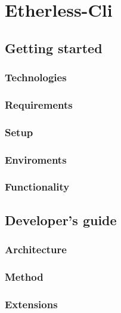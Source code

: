 \section{Etherless-Cli}

	\subsection{Getting started}
	
		\subsubsection{Technologies} %
			
		\subsubsection{Requirements} %
			
		\subsubsection{Setup} %
		
		\subsubsection{Enviroments} %
		
		\subsubsection{Functionality} %
	
	
	\subsection{Developer's guide}
	
		\subsubsection{Architecture} %
		
		\subsubsection{Method} %
		
		\subsubsection{Extensions}  %